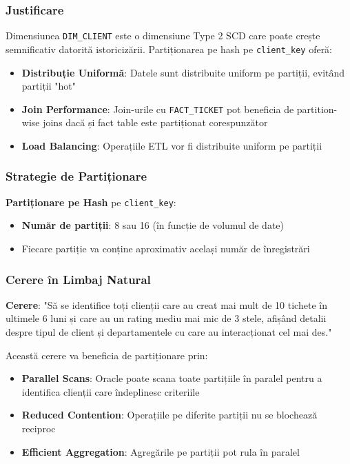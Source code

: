 \subsubsection{Justificare}

Dimensiunea \texttt{DIM\_CLIENT} este o dimensiune Type 2 SCD care poate crește semnificativ datorită istoricizării. Partiționarea pe hash pe \texttt{client\_key} oferă:

\begin{itemize}
    \item \textbf{Distribuție Uniformă}: Datele sunt distribuite uniform pe partiții, evitând partiții "hot"
    \item \textbf{Join Performance}: Join-urile cu \texttt{FACT\_TICKET} pot beneficia de partition-wise joins dacă și fact table este partiționat corespunzător
    \item \textbf{Load Balancing}: Operațiile ETL vor fi distribuite uniform pe partiții
\end{itemize}

\subsubsection{Strategie de Partiționare}

\textbf{Partiționare pe Hash} pe \texttt{client\_key}:
\begin{itemize}
    \item \textbf{Număr de partiții}: 8 sau 16 (în funcție de volumul de date)
    \item Fiecare partiție va conține aproximativ același număr de înregistrări
\end{itemize}

\subsubsection{Cerere în Limbaj Natural}

\textbf{Cerere}: "Să se identifice toți clienții care au creat mai mult de 10 tichete în ultimele 6 luni și care au un rating mediu mai mic de 3 stele, afișând detalii despre tipul de client și departamentele cu care au interacționat cel mai des."

Această cerere va beneficia de partiționare prin:
\begin{itemize}
    \item \textbf{Parallel Scans}: Oracle poate scana toate partițiile în paralel pentru a identifica clienții care îndeplinesc criteriile
    \item \textbf{Reduced Contention}: Operațiile pe diferite partiții nu se blochează reciproc
    \item \textbf{Efficient Aggregation}: Agregările pe partiții pot rula în paralel
\end{itemize}

